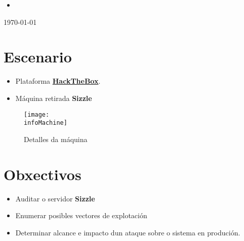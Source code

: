 \documentclass[a4paper]{article}
\newcommand{\machineName}{Sizzle}\par
\newcommand{\infoMachine}{machine_sizzle_info.png}
\newcommand{\startDate}{\today}
\begin{document}
\begin{titlepage}
\begin{tcolorbox}
\begin{itemize}[leftmargin=5.5mm]
        \item \href{https://github.com/ricardofc/repoEDU-CCbySA/tree/main/SI/Pentester/ActiveDirectory}{\color{blue}{https://github.com/ricardofc/repoEDU-CCbySA/tree/main/SI/Pentester/ActiveDirectory}}
        \end{itemize}
\end{tcolorbox}
        \vspace*{-0.1cm} 
        {\large \startDate \par}
        \end{titlepage}
        \clearpage
        \tableofcontents
        \clearpage
        \section{Escenario}
        \begin{itemize}
                \item Plataforma \href{https://hackthebox.eu}{\textbf{\color{blue}HackTheBox}}.
                \item Máquina retirada \textbf{\machineName} 
        \end{itemize}
        \vspace{0.2cm}
        \begin{figure}[h]
                \centering
                \texttt{[image: \\infoMachine]}
                \caption{Detalles da máquina}
        \end{figure}
        \begin{tcolorbox}[enhanced,attach boxed title to top center={yshift=-3mm,yshifttext=-1mm},
  colback=blue!5!white,colframe=blue!75!black,colbacktitle=green!80!black,
  title=Dirección URL,fonttitle=\bfseries,
  boxed title style={size=small,colframe=red!50!black} ]
  \centering
  \vspace{0.1cm}
  \href{https://app.hackthebox.com/machines/169}{\color{blue}{https://app.hackthebox.com/machines/169}}
\end{tcolorbox}

        \section{Obxectivos}
        \begin{itemize}
                \item Auditar o servidor \textbf{\machineName}
                \item Enumerar posibles vectores de explotación
                \item Determinar alcance e impacto dun ataque sobre o sistema en produción.
        \end{itemize}
\end{document}
